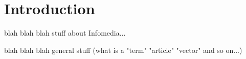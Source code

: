 \chapter{Introduction}

blah blah blah stuff about Infomedia...


blah blah blah general stuff (what is a "term" "article" "vector" and so on...)